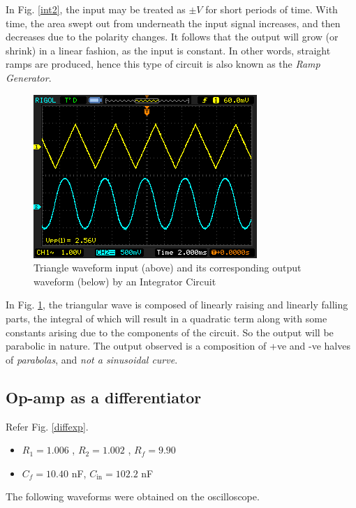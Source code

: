    In Fig. \ref{int2}, the input may be treated as $\pm V$ for short periods of time. With time, the area swept out from underneath the input signal increases, and then decreases due to the polarity changes. It follows that the output will grow (or shrink) in a linear fashion, as the input is constant. In other words, straight ramps are produced, hence this type of circuit is also known as the \textit{Ramp Generator}.

    \begin{figure}[H]
        \centering
        \includegraphics[width=0.75\columnwidth]{images/int3.png}
        \caption{Triangle waveform input (above) and its corresponding output waveform (below) by an Integrator Circuit}
        \label{int3}
    \end{figure}

    In Fig. \ref{int3}, the triangular wave is composed of linearly raising and linearly falling parts, the integral of which will result in a quadratic term along with some constants arising due to the components of the circuit. So the output will be parabolic in nature. The output observed is a composition of +ve and -ve halves of \textit{parabolas}, and \textit{not a sinusoidal curve}.


\subsection{Op-amp as a differentiator}
    Refer Fig. \ref{diffexp}.
    \begin{itemize}
        \item $R_1 = 1.006$ \kohm, $R_2 = 1.002$ \kohm, $R_f = 9.90$ \kohm
        \item $C_f = 10.40$ nF, $C_\text{in} = 102.2$ nF\\
    \end{itemize}
    The following waveforms were obtained on the oscilloscope.

